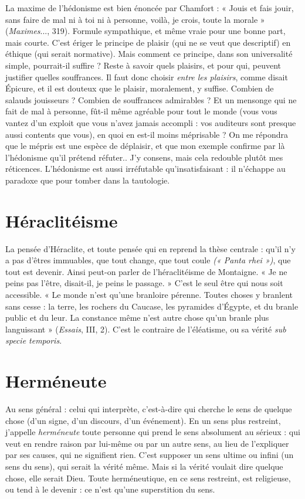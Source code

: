La maxime de l’hédonisme est bien énoncée par Chamfort : « Jouis et fais
jouir, sans faire de mal ni à toi ni à personne, voilà, je crois, toute la morale »
({\it Maximes}..., 319). Formule sympathique, et même vraie pour une bonne part,
mais courte. C’est ériger le principe de plaisir (qui ne se veut que descriptif) en
éthique (qui serait normative). Mais comment ce principe, dans son universalité
simple, pourrait-il suffire ? Reste à savoir quels plaisirs, et pour qui, peuvent
justifier quelles souffrances. Il faut donc choisir {\it entre les plaisirs}, comme disait
Épicure, et il est douteux que le plaisir, moralement, y suffise. Combien de
salauds jouisseurs ? Combien de souffrances admirables ? Et un mensonge qui
ne fait de mal à personne, fût-il même agréable pour tout le monde (vous vous
vantez d’un exploit que vous n’avez jamais accompli : vos auditeurs sont
presque aussi contents que vous), en quoi en est-il moins méprisable ? On me
répondra que le mépris est une espèce de déplaisir, et que mon exemple
confirme par là l’hédonisme qu’il prétend réfuter.. J'y consens, mais cela
redouble plutôt mes réticences. L’hédonisme est aussi irréfutable qu’insatisfaisant :
il n'échappe au paradoxe que pour tomber dans la tautologie.

\section{Héraclitéisme}
La pensée d'Héraclite, et toute pensée qui en reprend la
thèse centrale : qu’il n’y a pas d'êtres immuables, que
tout change, que tout coule {\it (« Panta rhei »)}, que tout est devenir. Ainsi peut-on
parler de l’héraclitéisme de Montaigne. « Je ne peins pas l'être, disait-il, je
peins le passage. » C’est le seul être qui nous soit accessible. « Le monde n’est
qu'une branloire pérenne. Toutes choses y branlent sans cesse : la terre, les
rochers du Caucase, les pyramides d'Égypte, et du branle public et du leur. La
constance même n'est autre chose qu’un branle plus languissant » ({\it Essais}, III,
2). C’est le contraire de l’éléatisme, ou sa vérité {\it sub specie temporis}.

\section{Herméneute}
Au sens général : celui qui interprète, c’est-à-dire qui
cherche le sens de quelque chose (d’un signe, d’un discours,
d’un événement). En un sens plus restreint, j’appelle {\it herméneute} toute
personne qui prend le sens absolument au sérieux : qui veut en rendre raison
par lui-même ou par un autre sens, au lieu de l’expliquer par ses causes, qui ne
signifient rien. C’est supposer un sens ultime ou infini (un sens du sens), qui
serait la vérité même. Mais si la vérité voulait dire quelque chose, elle serait
Dieu. Toute herméneutique, en ce sens restreint, est religieuse, ou tend à le
devenir : ce n’est qu’une superstition du sens.

